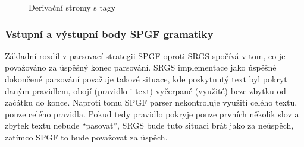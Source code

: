 \begin{figure}[ht!]
	\hspace{1cm}
	\caption{Derivační stromy s tagy}\label{fig:derivacni_stromy_tagy}
\end{figure}


\subsubsection{Vstupní a výstupní body SPGF gramatiky}
Základní rozdíl v parsovací strategii SPGF oproti SRGS spočívá v tom, co je považováno za úspěšný konec parsování.
SRGS implementace
jako úspěšně dokončené parsování považuje takové situace, kde poskytnutý text byl
pokryt daným pravidlem, obojí (pravidlo i text) vyčerpané (využité) beze zbytku od začátku do konce.
Naproti tomu SPGF parser nekontroluje využití celého textu, pouze celého pravidla.
Pokud tedy pravidlo pokryje pouze prvních několik slov a zbytek textu nebude \enquote{pasovat},
SRGS bude tuto situaci brát jako za neúspěch, zatímco SPGF to bude považovat za úspěch.

